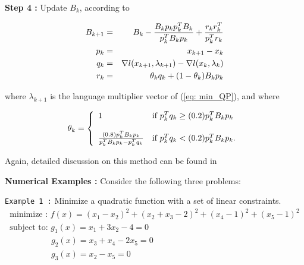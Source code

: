 \vspace{0.15 in}\noindent
{\bf Step 4 :}
Update {\bf $ B_k $}, according to

\begin{eqnarray}
 B_{k+1} & = & B_{k} - {{B_kp_kp_k^TB_k} \over {p_k^TB_kp_k}} + {{r_kr_k^T} \over {p_k^Tr_k}} \\
 p_k     & = & x_{k+1} - x_k  \\
 q_k     & = & \nabla l(x_{k+1},\lambda_{k+1}) - \nabla l(x_k,\lambda_k)  \\
 r_k     & = & \theta_k q_k + (1-\theta_k) B_kp_k 
\end{eqnarray}

\vspace{0.15 in}\noindent
where $\lambda_{k+1} $ is the language
multiplier vector of (\ref{eq: min_QP}), and where 

\begin{equation}
\theta_k = \left \{ \begin{array}{ll}
                   1 &   \mbox{if $ p_k^Tq_k \geq (0.2) p_k^TB_kp_k $ }\\
                     & \\
{(0.8) p_k^TB_kp_k} \over {p_k^TB_kp_k-p_k^Tq_k} & \mbox{if $ p_k^Tq_k < (0.2) p_k^TB_kp_k $}.
                    \end{array}
           \right.
\end{equation}

\vspace{0.15 in}\noindent
Again, detailed discussion on this method
can be found in ~\cite{Luenberger84}

\vspace{0.15 in}\noindent
{\bf Numerical Examples :}
Consider the following three problems:

\vspace{0.10 in}\noindent
{\tt Example 1 :} Minimize a quadratic function with a set of linear constraints.
\begin{equation}
\begin{array}{l}
\mbox{minimize  : }f(x)   = (x_1-x_2)^2 + (x_2+x_3-2)^2 + (x_4-1)^2 +(x_5-1)^2\\
\mbox{subject to: }g_1(x) = x_1+3x_2    -4 = 0  \\
\mbox{~~~~~~~~~~~~~~~}g_2(x) = x_3+x_4-2x_5   = 0  \\             
\mbox{~~~~~~~~~~~~~~~}g_3(x) = x_2     -x_5   = 0              
\end{array}
\end{equation}

